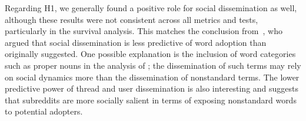 Regarding H1, we generally found a positive role for social dissemination as well, although these results were not consistent across all metrics and tests, particularly in the survival analysis.
This matches the conclusion from~, who argued that social dissemination is less predictive of word adoption than~ originally suggested.
One possible explanation is the inclusion of word categories such as proper nouns in the analysis of ; the dissemination of such terms may rely on social dynamics more than the dissemination of nonstandard terms.
The lower predictive power of thread and user dissemination is also interesting and suggests that subreddits are more socially salient in terms of exposing nonstandard words to potential adopters.






